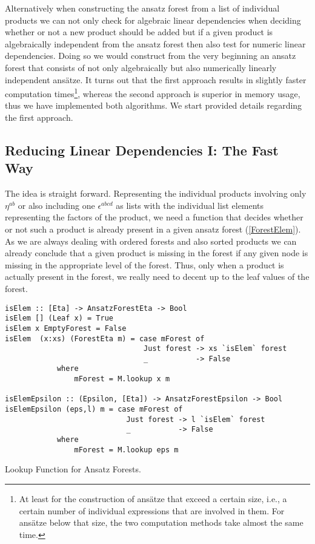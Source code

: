Alternatively when constructing the ansatz forest from a list of individual products we can not only check for algebraic linear dependencies when deciding whether or not a new product should be added but if a given product is algebraically  independent from the ansatz forest then also test for numeric linear dependencies. Doing so we would construct from the very beginning an ansatz forest that consists of not only algebraically but also numerically linearly independent ansätze.
It turns out that the first approach results in slightly faster computation times\footnote{At least for the construction of ansätze that exceed a certain size, i.e., a certain number of individual expressions that are involved in them.
For ansätze below that size, the two computation methods take almost the same time.}, whereas the second approach is superior in memory usage, thus we have implemented both algorithms. 
We start provided details regarding the first approach. 

\subsection*{Reducing Linear Dependencies I:  The Fast Way}

The idea is straight forward. Representing the individual products involving only $\eta^{ab}$ or also including one $\epsilon^{abcd}$ as lists with the individual list elements representing the factors of the product, we need a function that decides whether or not such a product is already present in a given ansatz forest (\ref{ForestElem}). As we are always dealing with ordered forests and also sorted products we can already conclude that a given product is missing in the forest if any given node is missing in the appropriate level of the forest. Thus, only when a product is actually present in the forest, we really need to decent up to the leaf values of the forest.
\begin{listing}[hbt!]
\begin{verbatim}
isElem :: [Eta] -> AnsatzForestEta -> Bool
isElem [] (Leaf x) = True
isElem x EmptyForest = False
isElem  (x:xs) (ForestEta m) = case mForest of
                                Just forest -> xs `isElem` forest
                                _           -> False
            where
                mForest = M.lookup x m

isElemEpsilon :: (Epsilon, [Eta]) -> AnsatzForestEpsilon -> Bool
isElemEpsilon (eps,l) m = case mForest of
                            Just forest -> l `isElem` forest
                            _           -> False
            where
                mForest = M.lookup eps m  
\end{verbatim} 
\caption{Lookup Function for Ansatz Forests.}\label{ForestElem}
\end{listing}

